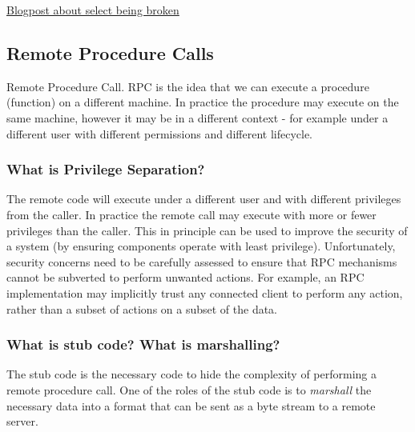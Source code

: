 \documentclass[]{article}
\begin{document}
\href{https://idea.popcount.org/2017-01-06-select-is-fundamentally-broken/}{Blogpost
about select being broken}

\subsection{Remote Procedure Calls}\label{what-is-rpc}

Remote Procedure Call. RPC is the idea that we can execute a procedure
(function) on a different machine. In practice the procedure may execute
on the same machine, however it may be in a different context - for
example under a different user with different permissions and different
lifecycle.

\subsubsection{What is Privilege
Separation?}\label{what-is-privilege-separation}

The remote code will execute under a different user and with different
privileges from the caller. In practice the remote call may execute with
more or fewer privileges than the caller. This in principle can be used
to improve the security of a system (by ensuring components operate with
least privilege). Unfortunately, security concerns need to be carefully
assessed to ensure that RPC mechanisms cannot be subverted to perform
unwanted actions. For example, an RPC implementation may implicitly
trust any connected client to perform any action, rather than a subset
of actions on a subset of the data.

\subsubsection{What is stub code? What is
marshalling?}\label{what-is-stub-code-what-is-marshalling}

The stub code is the necessary code to hide the complexity of performing
a remote procedure call. One of the roles of the stub code is to
\emph{marshall} the necessary data into a format that can be sent as a
byte stream to a remote server.
\end{document}
